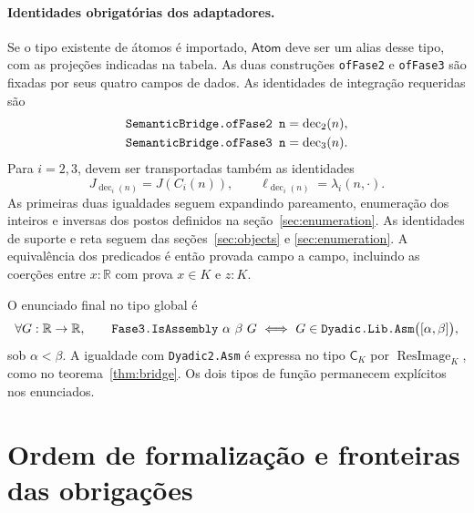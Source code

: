 \documentclass[11pt,a4paper]{article}
\newcommand{\R}{\mathbb R}
\newcommand{\Atoms}{\mathsf{Atom}}
\newcommand{\CK}{\mathsf C_K}
\newcommand{\ImageRes}{\operatorname{ResImage}}
\newcommand{\dec}{\operatorname{dec}}
\newcommand{\code}[1]{\nolinkurl{#1}}
\begin{document}
\paragraph{Identidades obrigatórias dos adaptadores.}
Se o tipo existente de átomos é importado, $\Atoms$ deve ser um
alias desse tipo, com as projeções indicadas na tabela.
As duas construções \code{ofFase2} e \code{ofFase3} são fixadas
por seus quatro campos de dados. As identidades de integração
requeridas são
\[
 \begin{aligned}
 \text{\ttfamily SemanticBridge.ofFase2 n}&=\dec_2(n),\\
 \text{\ttfamily SemanticBridge.ofFase3 n}&=\dec_3(n).
 \end{aligned}
\]
Para $i=2,3$, devem ser transportadas também as identidades
\[
 J_{\dec_i(n)}=J(C_i(n)),\qquad
 \ell_{\dec_i(n)}=\lambda_i(n,\cdot).
\]
As primeiras duas igualdades seguem expandindo pareamento, enumeração dos
inteiros e inversas dos postos definidos na
seção~\ref{sec:enumeration}. As identidades de suporte e reta seguem das
seções~\ref{sec:objects} e \ref{sec:enumeration}.
A equivalência dos predicados é então provada campo a campo,
incluindo as coerções entre $x:\R$ com prova $x\in K$ e $z:K$.

O enunciado final no tipo global é
\[
 \forall G:\R\to\R,\qquad
 \text{\ttfamily Fase3.IsAssembly}\ \alpha\ \beta\ G
 \ \Longleftrightarrow\
 G\in\text{\ttfamily Dyadic.Lib.Asm}\bigl([\alpha,\beta]\bigr),
\]
sob $\alpha<\beta$. A igualdade com \code{Dyadic2.Asm} é
expressa no tipo $\CK$ por $\ImageRes_K$, como no
teorema~\ref{thm:bridge}. Os dois tipos de função permanecem
explícitos nos enunciados.

\section{Ordem de formalização e fronteiras das obrigações}
\label{sec:dependencies}
\end{document}
